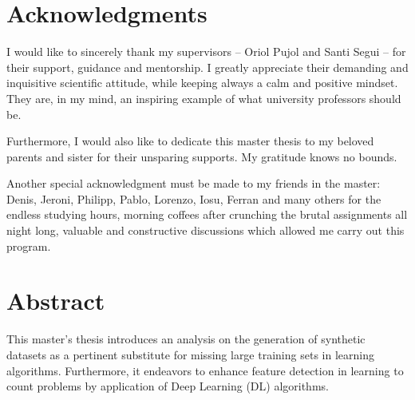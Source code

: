 \documentclass[11pt, oneside]{book}
\begin{document}
%
%
%
\setcounter{page}{3}

\thispagestyle{empty}

\thispagestyle{empty}
\chapter*{Acknowledgments}
\thispagestyle{empty}

I would like to sincerely thank my supervisors -- Oriol Pujol and Santi Segui -- for their support, guidance and mentorship. I greatly appreciate their demanding and inquisitive scientific attitude, while keeping always a calm and positive mindset. They are, in my mind, an inspiring example of what university professors should be.

Furthermore, I would also like to dedicate this master thesis to my beloved parents and sister for their unsparing supports. My gratitude knows no bounds.

Another special acknowledgment must be made to my friends in the master: Denis, Jeroni, Philipp, Pablo, Lorenzo, Iosu, Ferran and many others for the endless studying hours, morning coffees after crunching the brutal assignments all night long, valuable and constructive discussions which allowed me carry out this program. 
 



\setcounter{page}{0}
\clearpage

\newpage
{} %
\chapter*{Abstract}
\thispagestyle{empty}

This master's thesis introduces an analysis  on the generation of synthetic datasets as a pertinent substitute for missing large training sets in learning algorithms. Furthermore, it endeavors to enhance feature detection in learning to count problems by application of Deep Learning (DL) algorithms. 
\end{document}
